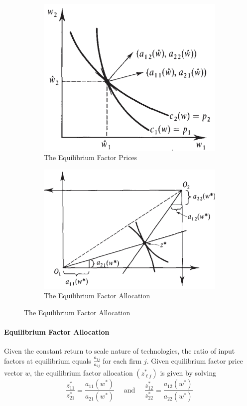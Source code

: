 \documentclass{report}
\begin{document}
			\begin{figure}[h]
				\centering
				\begin{subfigure}{.45\textwidth}
					\centering
					\includegraphics[width=0.7\linewidth]{figures/equilibrium_factor_prices}
					\caption{The Equilibrium Factor Prices}
				\end{subfigure}
				\begin{subfigure}{.45\textwidth}
					\centering
					\includegraphics[width=1\linewidth]{figures/equilibrium_factor_allocation}
					\caption{The Equilibrium Factor Allocation}
				\end{subfigure}
			\end{figure}
			
			\paragraph{Equilibrium Factor Allocation} Given the constant return to scale nature of technologies, the ratio of input factors at equilibrium equals $\frac{a_{1j}}{a_{2j}}$ for each firm $j$. Given equilibrium factor price vector $w$, the equilibrium factor allocation $(z^*_{\ell j})$ is given by solving
			\begin{equation}
				\frac{z_{11}^{*}}{z_{21}^{*}}=\frac{a_{11}\left(w^{*}\right)}{a_{21}\left(w^{*}\right)} \quad \text { and } \quad \frac{z_{12}^{*}}{z_{22}^{*}}=\frac{a_{12}\left(w^{*}\right)}{a_{22}\left(w^{*}\right)}
			\end{equation}
			
\end{document}
